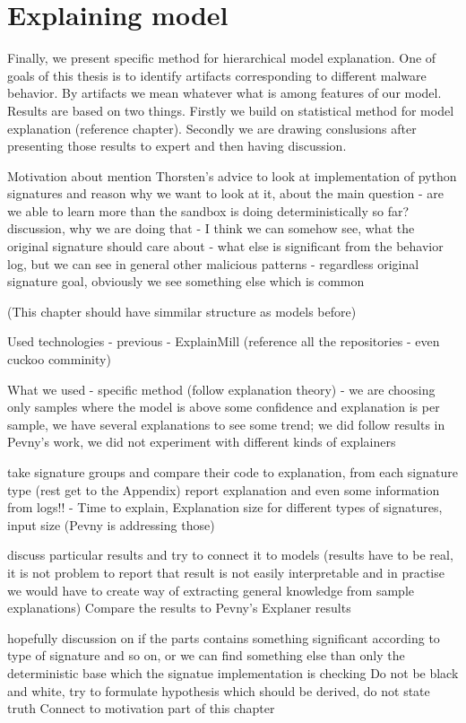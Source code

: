 \chapter{Explaining model}
Finally, we present specific method for hierarchical model explanation. One of goals of this thesis is to identify artifacts corresponding to different malware behavior. By artifacts we mean whatever what is among features of our model. Results are based on two things. Firstly we build on statistical method for model explanation (reference chapter). Secondly we are drawing conslusions after presenting those results to expert and then having discussion.

Motivation about mention Thorsten's advice to look at implementation of python signatures and reason why we want to look at it, about the main question - are we able to learn more than the sandbox is doing deterministically so far?
discussion, why we are doing that - I think we can somehow see, what the original signature should care about - what else is significant from the behavior log, but we can see in general other malicious patterns - regardless original signature goal, obviously we see something else which is common

(This chapter should have simmilar structure as models before)

Used technologies
  - previous
  - ExplainMill
  (reference all the repositories - even cuckoo comminity)

What we used - specific method (follow explanation theory) - we are choosing only samples where the model is above some confidence and explanation is per sample, we have several explanations to see some trend; we did follow results in Pevny's work, we did not experiment with different kinds of explainers

take signature groups and compare their code to explanation, from each signature type (rest get to the Appendix)
report explanation and even some information from logs!!
- Time to explain, Explanation size for different types of signatures, input size (Pevny is addressing those)

discuss particular results and try to connect it to models (results have to be real, it is not problem to report that result is not easily interpretable and in practise we would have to create way of extracting general knowledge from sample explanations)
Compare the results to Pevny's Explaner results


hopefully discussion on if the parts contains something significant according to type of signature and so on, or we can find something else than only the deterministic base which the signatue implementation is checking
Do not be black and white, try to formulate hypothesis which should be derived, do not state truth
Connect to motivation part of this chapter

